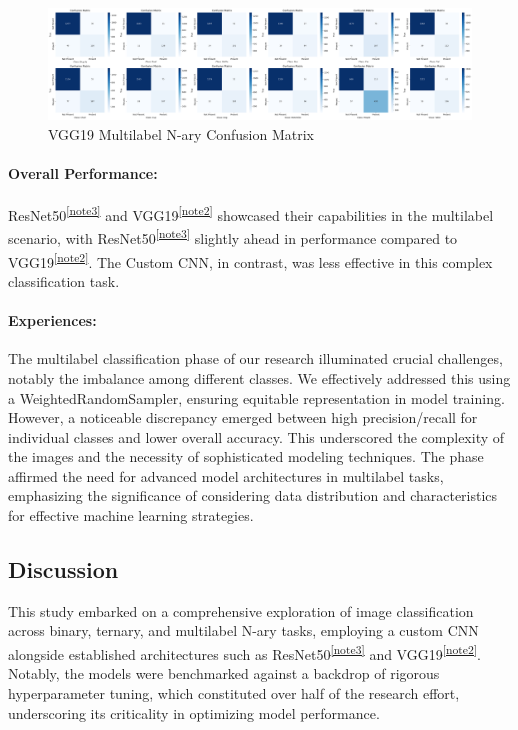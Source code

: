 \documentclass{article} %
\begin{document}
\begin{figure}[htbp]
  \centering
  \includegraphics[width=1.0\textwidth]{./figure+object/VGG_labels_BCE.png}
  \caption{VGG19 Multilabel N-ary Confusion Matrix}
  \label{fig:vgg_cm_mul}
\end{figure}

\paragraph{Overall Performance:}
ResNet50\textsuperscript{\ref{note3}} and VGG19\textsuperscript{\ref{note2}} showcased their capabilities in the multilabel scenario, with ResNet50\textsuperscript{\ref{note3}} slightly ahead in performance compared to VGG19\textsuperscript{\ref{note2}}. The Custom CNN, in contrast, was less effective in this complex classification task.

\paragraph{Experiences:}
The multilabel classification phase of our research illuminated crucial challenges, notably the imbalance among different classes. We effectively addressed this using a WeightedRandomSampler, ensuring equitable representation in model training. However, a noticeable discrepancy emerged between high precision/recall for individual classes and lower overall accuracy. This underscored the complexity of the images and the necessity of sophisticated modeling techniques. The phase affirmed the need for advanced model architectures in multilabel tasks, emphasizing the significance of considering data distribution and characteristics for effective machine learning strategies.


\subsection{Discussion}
This study embarked on a comprehensive exploration of image classification across binary, ternary, and multilabel N-ary tasks, employing a custom CNN alongside established architectures such as ResNet50\textsuperscript{\ref{note3}} and VGG19\textsuperscript{\ref{note2}}. Notably, the models were benchmarked against a backdrop of rigorous hyperparameter tuning, which constituted over half of the research effort, underscoring its criticality in optimizing model performance.
\end{document}
